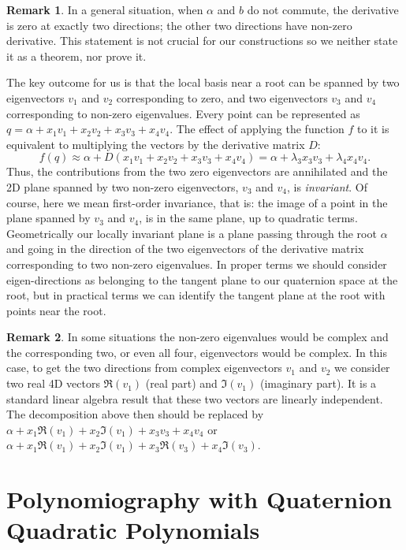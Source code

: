 \documentclass{article}
\theoremstyle{definition}
\newtheorem{remark}{Remark}
\begin{document}
\begin{remark}
In a general situation, when $\alpha$ and $b$ do not commute, the derivative is zero at exactly two directions; the other two directions have non-zero derivative. This statement is not crucial for our constructions so we neither state it as a theorem, nor prove it.

The key outcome for us is that the local basis near a root can be spanned by two eigenvectors $v_1$ and $v_2$ corresponding to zero, and two eigenvectors $v_3$ and $v_4$ corresponding to non-zero eigenvalues. Every point can be represented as $q=\alpha+x_1v_1+x_2v_2+x_3v_3+x_4v_4$. The effect of applying the function $f$ to it is equivalent to multiplying the vectors by the derivative matrix $D$:
\begin{equation}
f(q) \approx \alpha+D(x_1v_1+x_2v_2+x_3v_3+x_4v_4) =\alpha+\lambda_3 x_3v_3+\lambda_4x_4v_4.
\end{equation}
Thus, the contributions from the two zero eigenvectors are annihilated and the 2D plane spanned by two non-zero eigenvectors, $v_3$ and $v_4$, is {\it invariant}. Of course, here we mean first-order invariance, that is: the image of a point in the plane spanned by $v_3$ and $v_4$, is in the same plane, up to quadratic terms. Geometrically our locally invariant plane is a plane passing through the root $\alpha$ and going in the direction of the two eigenvectors of the derivative matrix corresponding to two non-zero eigenvalues. In proper terms we should consider eigen-directions as belonging to the tangent plane to our quaternion space at the root, but in practical terms we can identify the tangent plane at the root with points near the root.
\end{remark}

\begin{remark}
In some situations the non-zero eigenvalues would be complex and the corresponding two, or even all four, eigenvectors would be complex. In this case, to get the two directions from complex eigenvectors $v_1$ and $v_2$ we consider two real 4D vectors $\Re(v_1)$ (real part) and $\Im(v_1)$ (imaginary part). It is a standard linear algebra result that these two vectors are linearly independent. The decomposition above then should be replaced by $\alpha+x_1\Re(v_1)+x_2 \Im(v_1)+x_3v_3+x_4v_4$ or $\alpha+x_1\Re(v_1)+x_2 \Im(v_1)+x_3\Re(v_3)+x_4\Im(v_3)$.
\end{remark}

\section{Polynomiography with Quaternion Quadratic Polynomials}
\end{document}
